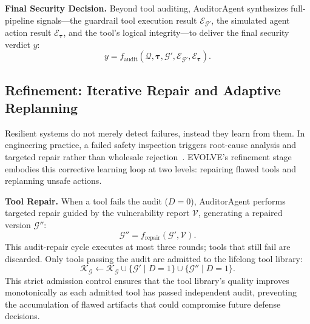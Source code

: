   \noindent\textbf{Final Security Decision.} Beyond tool auditing, AuditorAgent synthesizes full-pipeline signals---the guardrail tool execution result $\mathcal{E}_{\mathcal{G}'}$, the simulated agent action result
  $\mathcal{E}_{\boldsymbol{\tau}}$, and the tool's logical integrity---to deliver the final security verdict $y$:
  \begin{equation}
      y = f_{\mathrm{audit}}\left( \mathcal{Q}, \boldsymbol{\tau}, \mathcal{G}', \mathcal{E}_{\mathcal{G}'}, \mathcal{E}_{\boldsymbol{\tau}} \right).
  \end{equation}


  \subsection{Refinement: Iterative Repair and Adaptive Replanning}

  Resilient systems do not merely detect failures, instead they learn from them. In engineering practice, a failed safety inspection triggers root-cause analysis and targeted repair rather than wholesale
  rejection~\citep{argyris1997organizational}. EVOLVE's refinement stage embodies this corrective learning loop at two levels: repairing flawed tools and replanning unsafe actions.

  \noindent\textbf{Tool Repair.} When a tool fails the audit ($D = 0$), AuditorAgent performs targeted repair guided by the vulnerability report $\mathcal{V}$, generating a repaired version $\mathcal{G}''$:
  \begin{equation}
      \mathcal{G}'' = f_{\mathrm{repair}}(\mathcal{G}', \mathcal{V}).
  \end{equation}
  This audit-repair cycle executes at most three rounds; tools that still fail are discarded. Only tools passing the audit are admitted to the lifelong tool library:
  \begin{equation}
      \mathcal{K}_{\mathcal{G}} \leftarrow \mathcal{K}_{\mathcal{G}} \cup \{\mathcal{G}' \mid D = 1\} \cup \{\mathcal{G}'' \mid D = 1\}.
  \end{equation}
  This strict admission control ensures that the tool library's quality improves monotonically as each admitted tool has passed independent audit, preventing the accumulation of flawed artifacts that could compromise future defense decisions.

